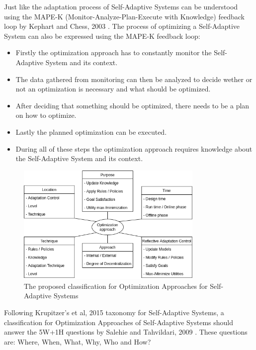 Just like the adaptation process of Self-Adaptive Systems can be understood using
the MAPE-K (Monitor-Analyze-Plan-Execute with Knowledge) feedback loop by Kephart and Chess, 2003 \cite*{VisionOfAutonomicComputing}.
The process of optimizing a Self-Adaptive System can also be expressed using the MAPE-K feedback loop:
\begin{itemize}
    \item Firstly the optimization approach has to constantly monitor the Self-Adaptive System and its context.
    \item The data gathered from monitoring can then be analyzed to decide wether or not an optimization is necessary and what should be optimized.
    \item After deciding that something should be optimized, there needs to be a plan on how to optimize.
    \item Lastly the planned optimization can be executed.
    \item During all of these steps the optimization approach requires knowledge about the Self-Adaptive System and its context.
\end{itemize}

\begin{figure}[h]
    \centering
    \includegraphics[width=0.8\textwidth]{images/ClassificationProposal-WithDimensions.png}
    \caption{The proposed classification for Optimization Approaches for Self-Adaptive Systems}
    \label{fig:Proposal}
\end{figure}

Following Krupitzer's et al, 2015 \cite*{SurveyOnEngineeringApproaches} taxonomy for Self-Adaptive Systems,
a classification for Optimization Approaches of Self-Adaptive Systems should answer 
the 5W+1H questions by Salehie and Tahvildari, 2009 \cite*{LandscapeAndResearchChallenges}.
These questions are: Where, When, What, Why, Who and How?
\newline
\par


